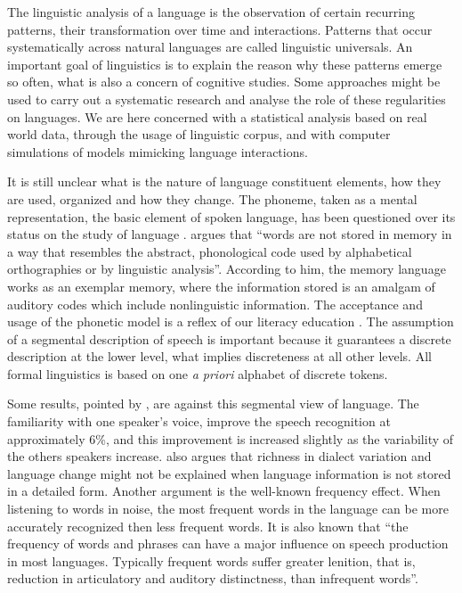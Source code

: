 The linguistic analysis of a language is the observation of certain recurring patterns,
their transformation over time and interactions. 
Patterns that occur systematically across natural languages are called linguistic universals. 
An important goal of linguistics is to explain the reason why these patterns emerge so often,
what is also a concern of cognitive studies.
Some approaches might be used to carry out a systematic research and analyse the role of 
these regularities on languages. We are here concerned with a statistical analysis based 
on real world data, through the usage of linguistic corpus, and with computer simulations
of models mimicking language interactions. 

It is still unclear what is the nature of language constituent elements, how they are used, organized and
how they change. The phoneme, taken as a mental representation, the basic element of spoken language, 
has been questioned over its status on the study of language \citep{port2007,port2005,port2006}.
\cite{port2007} argues that ``words are not stored in memory in a way that resembles the abstract, 
phonological code used by alphabetical orthographies or by linguistic analysis''. 
According to him, the memory language works as an exemplar memory, where the information stored is an amalgam 
of auditory codes which include nonlinguistic information. The acceptance and usage of the phonetic model is 
a reflex of our literacy education \citep{port2007,coleman2002}. The assumption of a segmental description of 
speech is important because it guarantees a discrete description at the lower level, what implies discreteness 
at all other levels. All formal linguistics is based on one \textit{a priori} alphabet of discrete tokens.

Some results, pointed by \cite{port2007}, are against this segmental view of language. 
The familiarity with one speaker's voice, improve the speech recognition at approximately 6\%, 
and this improvement is increased slightly as the variability of the others speakers increase. 
\cite{port2007} also argues that richness in dialect variation and language change might not be explained 
when language information is not stored in a detailed form. Another argument is the well-known frequency effect. 
When listening to words in noise, the most frequent words in the language can be more accurately recognized 
then less frequent words. It is also known that ``the frequency of words and phrases can have a major influence 
on speech production in most languages. Typically frequent words suffer greater lenition, that is, 
reduction in articulatory and auditory distinctness, than infrequent words''\citep{port2007}. 

